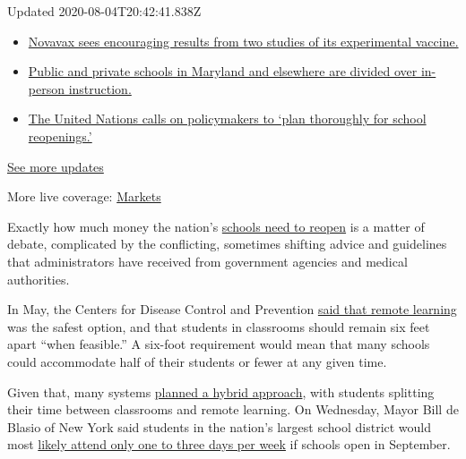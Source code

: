 Updated 2020-08-04T20:42:41.838Z

\begin{itemize}
\tightlist
\item
  \href{https://www.nytimes.com/2020/08/04/world/coronavirus-cases.html?action=click\&pgtype=Article\&state=default\&region=MAIN_CONTENT_1\&context=storylines_live_updates\#link-1228a480}{Novavax
  sees encouraging results from two studies of its experimental
  vaccine.}
\item
  \href{https://www.nytimes.com/2020/08/04/world/coronavirus-cases.html?action=click\&pgtype=Article\&state=default\&region=MAIN_CONTENT_1\&context=storylines_live_updates\#link-4825b93}{Public
  and private schools in Maryland and elsewhere are divided over
  in-person instruction.}
\item
  \href{https://www.nytimes.com/2020/08/04/world/coronavirus-cases.html?action=click\&pgtype=Article\&state=default\&region=MAIN_CONTENT_1\&context=storylines_live_updates\#link-50f7386d}{The
  United Nations calls on policymakers to `plan thoroughly for school
  reopenings.'}
\end{itemize}

\href{https://www.nytimes.com/2020/08/04/world/coronavirus-cases.html?action=click\&pgtype=Article\&state=default\&region=MAIN_CONTENT_1\&context=storylines_live_updates}{See
more updates}

More live coverage:
\href{https://www.nytimes.com/live/2020/08/04/business/stock-market-today-coronavirus?action=click\&pgtype=Article\&state=default\&region=MAIN_CONTENT_1\&context=storylines_live_updates}{Markets}

Exactly how much money the nation's
\href{https://www.nytimes.com/2020/07/16/upshot/coronavirus-school-reopening-private-public-gap.html}{schools
need to reopen} is a matter of debate, complicated by the conflicting,
sometimes shifting advice and guidelines that administrators have
received from government agencies and medical authorities.

In May, the Centers for Disease Control and Prevention
\href{https://www.cdc.gov/coronavirus/2019-ncov/community/schools-childcare/schools.html}{said
that remote learning} was the safest option, and that students in
classrooms should remain six feet apart ``when feasible.'' A six-foot
requirement would mean that many schools could accommodate half of their
students or fewer at any given time.

Given that, many systems
\href{https://www.nytimes.com/2020/06/26/us/coronavirus-schools-reopen-fall.html}{planned
a hybrid approach}, with students splitting their time between
classrooms and remote learning. On Wednesday, Mayor Bill de Blasio of
New York said students in the nation's largest school district would
most
\href{https://www.nytimes.com/2020/07/08/nyregion/nyc-schools-reopening-plan.html}{likely
attend only one to three days per week} if schools open in September.

